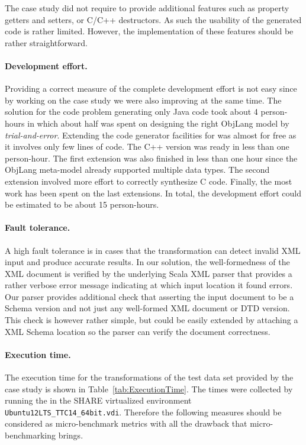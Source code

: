 The case study did not require to provide additional features such as property getters and setters, or C/C++ destructors.
As such the usability of the generated code is rather limited.
However, the implementation of these features should be rather straightforward.

\paragraph{Development effort.}

Providing a correct measure of the complete development effort is not easy since by working on the case study we were also improving \SIGMA at the same time.
The solution for the code problem generating only Java code took about 4 person-hours in which about half was spent on designing the right ObjLang model by \emph{trial-and-error}.
Extending the code generator facilities for \Csharp was almost for free as it involves only few lines of code.
The C++ version was ready in less than one person-hour.
The first extension was also finished in less than one hour since the ObjLang meta-model already supported multiple data types.
The second extension involved more effort to correctly synthesize C code.
Finally, the most work has been spent on the last extensions.
In total, the development effort could be estimated to be about 15 person-hours.

\paragraph{Fault tolerance.}
%
A high fault tolerance is in cases that the transformation can detect invalid XML input and produce accurate results.
In our solution, the well-formedness of the XML document is verified by the underlying Scala XML parser that provides a rather verbose error message indicating at which input location it found errors.
Our parser provides additional check that asserting the input document to be a  Schema version and not just any well-formed XML document or \FXIML DTD version.
This check is however rather simple, but could be easily extended by attaching a \FIXML XML Schema location so the parser can verify the document correctness.

\paragraph{Execution time.}

The execution time for the transformations of the test data set provided by the case study is shown in Table~\ref{tab:ExecutionTime}.
The times were collected by running the in the SHARE virtualized environment \texttt{Ubuntu12LTS\_TTC14\_64bit\SIGMA.vdi}.
Therefore the following measures should be considered as micro-benchmark metrics with all the drawback that micro-benchmarking brings.

